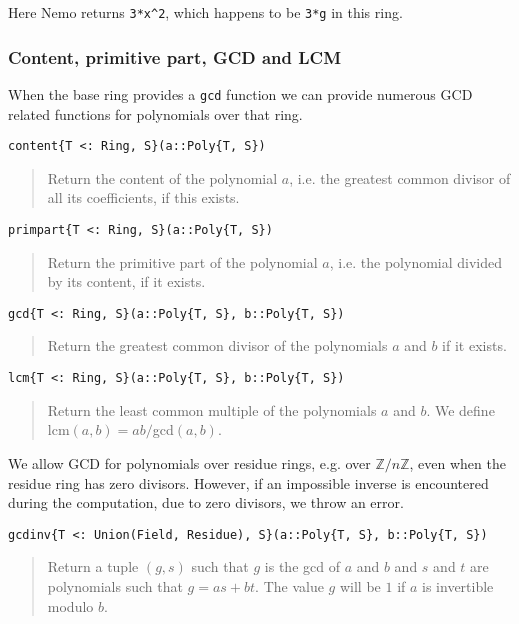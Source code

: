 \documentclass[a4paper,10pt]{article}
\newcommand{\Z}{\mathbb{Z}}
\newcommand{\code}{\lstinline}
\newcommand{\desc}[1]{\vspace{-3mm}\begin{quote}#1\end{quote}}
\begin{document}
{{{Here Nemo returns \code{3*x^2}, which happens to be \code{3*g} in this
ring.

\subsubsection{Content, primitive part, GCD and LCM}

When the base ring provides a \code{gcd} function we can provide numerous
GCD related functions for polynomials over that ring.

\begin{lstlisting}
content{T <: Ring, S}(a::Poly{T, S})
\end{lstlisting}

\desc{Return the content of the polynomial $a$, i.e. the greatest common divisor
of all its coefficients, if this exists.}

\begin{lstlisting}
primpart{T <: Ring, S}(a::Poly{T, S})
\end{lstlisting}

\desc{Return the primitive part of the polynomial $a$, i.e. the polynomial
divided by its content, if it exists.}

\begin{lstlisting}
gcd{T <: Ring, S}(a::Poly{T, S}, b::Poly{T, S})
\end{lstlisting}

\desc{Return the greatest common divisor of the polynomials $a$ and $b$ if 
it exists.}

\begin{lstlisting}
lcm{T <: Ring, S}(a::Poly{T, S}, b::Poly{T, S})
\end{lstlisting}

\desc{Return the least common multiple of the polynomials $a$ and $b$. We
define lcm$(a, b) = ab/$gcd$(a, b)$.}

We allow GCD for polynomials over residue rings, e.g. over $\Z/n\Z$, even when
the residue ring has zero divisors. However, if an impossible inverse is
encountered during the computation, due to zero divisors, we throw an error.

\begin{lstlisting}
gcdinv{T <: Union(Field, Residue), S}(a::Poly{T, S}, b::Poly{T, S})
\end{lstlisting}

\desc{Return a tuple $(g, s)$ such that $g$ is the gcd of $a$ and $b$ and $s$
and $t$ are polynomials such that $g = as + bt$. The value $g$ will be $1$ if
$a$ is invertible modulo $b$.}

}}}
\end{document}
